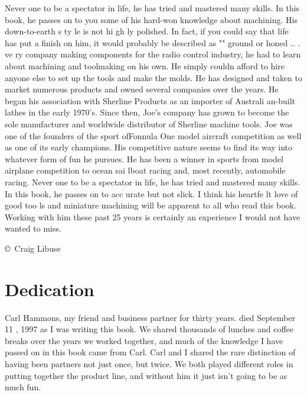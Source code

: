 Never one to be a spectator in life, he has tried and mastered many skills. In
this book, he passes on to you some of his hard-won knowledge about machining.
His down-to-earth s ty le is not hi gh ly polished. In fact, if you could say
that life has put a finish on him, it would probably be described as "" ground
or honed .. . ve ry company making components for the radio control industry, he
had to learn about machining and toolmaking on his own. He simply couldn afford
to hire anyone else to set up the tools and make the molds. He has designed and
taken to market numerous products and owned several companies over the years. He
began his association with Sherline Products as an importer of Australi an-built
lathes in the early 1970's. Since then, Joe's company has grown to become the
sole manufacturer and worldwide distributor of Sherline machine tools.
Joe was one of the founders of the sport ofFonnula One model aircraft
competition as well as one of its early champions. His competitive nature seems
to find its way into whatever form of fun he pursues. He has been a winner in
sports from model airplane competition to ocean sai lboat racing and, most
recently, automobile racing. Never one to be a spectator in life, he has tried
and mastered many skills. In this book, he passes on to acc urate but not slick.
I think his heartfe lt love of good too ls and miniature machining will be
apparent to all who read this book. Working with him these past 25 years is
certainly an experience I would not have wanted to miss.

\bigskip\copyright\ Craig Libuse

\chapter{Dedication}


Carl Hammons, my friend and business partner
for thirty years. died September 11 , 1997 as I
was writing this book. We shared thousands of
lunches and coffee breaks over the years we worked
together, and much of the knowledge I have passed
on in this book came from Carl. Carl and I shared
the rare distinction of having been partners not just
once, but twice. We both played different roles in
putting together the product line, and without him
it just isn't going to be as much fun.

